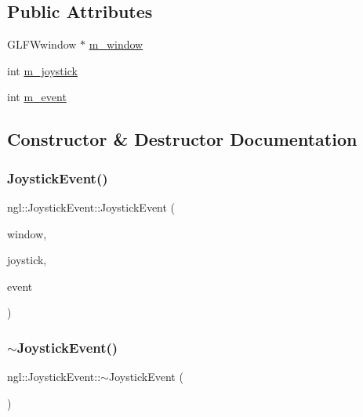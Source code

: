 \subsection*{Public Attributes}
\begin{DoxyCompactItemize}
\item 
G\+L\+F\+Wwindow $\ast$ \mbox{\hyperlink{structngl_1_1_joystick_event_a7bc6a4d772406cdbf190c9ede593fa63}{m\+\_\+window}}
\item 
int \mbox{\hyperlink{structngl_1_1_joystick_event_a55b141fd552a5419bdf53f5894ae68ca}{m\+\_\+joystick}}
\item 
int \mbox{\hyperlink{structngl_1_1_joystick_event_abfdd91c72dcac06e136e82889086fbed}{m\+\_\+event}}
\end{DoxyCompactItemize}


\subsection{Constructor \& Destructor Documentation}
\mbox{\label{structngl_1_1_joystick_event_a4c67974cb27d737b5c5ab3d8929d4824}} 
\subsubsection{\texorpdfstring{Joystick\+Event()}{JoystickEvent()}}
{\footnotesize\ttfamily ngl\+::\+Joystick\+Event\+::\+Joystick\+Event (\begin{DoxyParamCaption}\item[{G\+L\+F\+Wwindow $\ast$}]{window,  }\item[{const int}]{joystick,  }\item[{const int}]{event }\end{DoxyParamCaption})}

\mbox{\label{structngl_1_1_joystick_event_abbd62217bcfd947bc9594f778db145a7}} 
\subsubsection{\texorpdfstring{$\sim$\+Joystick\+Event()}{~JoystickEvent()}}
{\footnotesize\ttfamily ngl\+::\+Joystick\+Event\+::$\sim$\+Joystick\+Event (\begin{DoxyParamCaption}{ }\end{DoxyParamCaption})}



